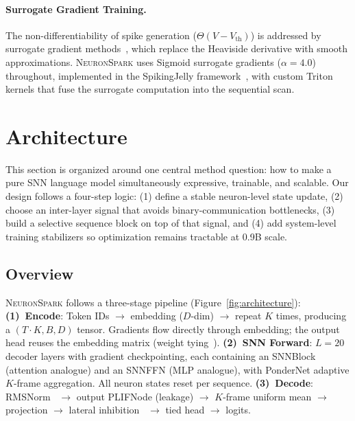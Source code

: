 \documentclass{article}
\newcommand{\model}{\textsc{NeuronSpark}}
\newcommand{\vth}{V_{\text{th}}}
\begin{document}
\paragraph{Surrogate Gradient Training.}
The non-differentiability of spike generation ($\Theta(V - \vth)$) is addressed by surrogate gradient methods~\citep{neftci2019surrogate, zenke2021remarkable}, which replace the Heaviside derivative with smooth approximations.
\model{} uses Sigmoid surrogate gradients ($\alpha=4.0$) throughout, implemented in the SpikingJelly framework~\citep{fang2023spikingjelly}, with custom Triton kernels that fuse the surrogate computation into the sequential scan.

\section{Architecture}
\label{sec:arch}

This section is organized around one central method question: how to make a pure SNN language model simultaneously expressive, trainable, and scalable. Our design follows a four-step logic: (1) define a stable neuron-level state update, (2) choose an inter-layer signal that avoids binary-communication bottlenecks, (3) build a selective sequence block on top of that signal, and (4) add system-level training stabilizers so optimization remains tractable at 0.9B scale.

\subsection{Overview}
\label{sec:overview}

\model{} follows a three-stage pipeline (Figure~\ref{fig:architecture}):
\textbf{(1)~Encode}: Token IDs $\to$ embedding ($D$-dim) $\to$ repeat $K$ times, producing a $(T{\cdot}K, B, D)$ tensor. Gradients flow directly through embedding; the output head reuses the embedding matrix (weight tying~\citep{press2017using}).
\textbf{(2)~SNN Forward}: $L{=}20$ decoder layers with gradient checkpointing, each containing an SNNBlock (attention analogue) and an SNNFFN (MLP analogue), with PonderNet adaptive $K$-frame aggregation. All neuron states reset per sequence.
\textbf{(3)~Decode}: RMSNorm~\citep{zhang2019root} $\to$ output PLIFNode (leakage) $\to$ $K$-frame uniform mean $\to$ projection $\to$ lateral inhibition~\citep{carandini2012normalization} $\to$ tied head $\to$ logits.
\end{document}
